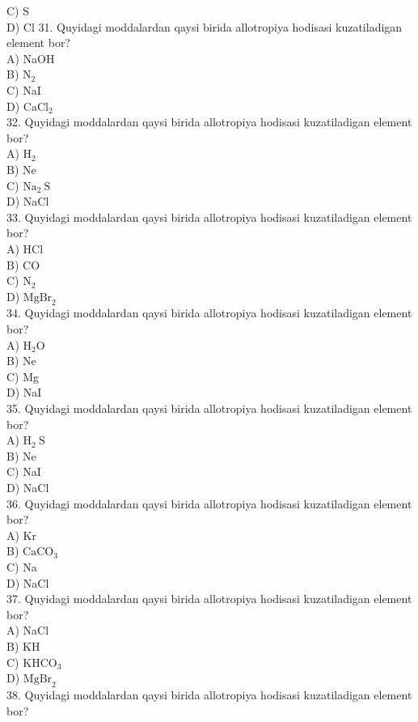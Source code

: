 C) S\\
D) Cl
31. Quyidagi moddalardan qaysi birida allotropiya hodisasi kuzatiladigan element bor?\\
A) NaOH\\
B) $\mathrm{N}_{2}$\\
C) NaI\\
D) $\mathrm{CaCl}_{2}$\\
32. Quyidagi moddalardan qaysi birida allotropiya hodisasi kuzatiladigan element bor?\\
A) $\mathrm{H}_{2}$\\
B) Ne\\
C) $\mathrm{Na}_{2} \mathrm{~S}$\\
D) NaCl\\
33. Quyidagi moddalardan qaysi birida allotropiya hodisasi kuzatiladigan element bor?\\
A) HCl\\
B) CO\\
C) $\mathrm{N}_{2}$\\
D) $\mathrm{MgBr}_{2}$\\
34. Quyidagi moddalardan qaysi birida allotropiya hodisasi kuzatiladigan element bor?\\
A) $\mathrm{H}_{2} \mathrm{O}$\\
B) Ne\\
C) Mg\\
D) NaI\\
35. Quyidagi moddalardan qaysi birida allotropiya hodisasi kuzatiladigan element bor?\\
A) $\mathrm{H}_{2} \mathrm{~S}$\\
B) Ne\\
C) NaI\\
D) NaCl\\
36. Quyidagi moddalardan qaysi birida allotropiya hodisasi kuzatiladigan element bor?\\
A) Kr\\
B) $\mathrm{CaCO}_{3}$\\
C) Na\\
D) NaCl\\
37. Quyidagi moddalardan qaysi birida allotropiya hodisasi kuzatiladigan element bor?\\
A) NaCl\\
B) KH\\
C) $\mathrm{KHCO}_{3}$\\
D) $\mathrm{MgBr}_{2}$\\
38. Quyidagi moddalardan qaysi birida allotropiya hodisasi kuzatiladigan element bor?\\
